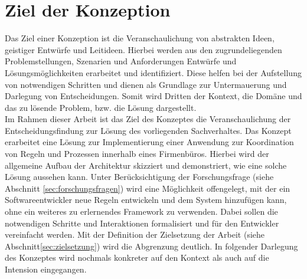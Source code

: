 \section{Ziel der Konzeption}
\label{sec:konzeptziele}
    Das Ziel einer Konzeption ist die Veranschaulichung von abstrakten Ideen, geistiger Entwürfe und Leitideen. 
    Hierbei werden aus den zugrundeliegenden Problemstellungen, Szenarien und Anforderungen Entwürfe und 
    Lösungsmöglichkeiten erarbeitet und identifiziert. Diese helfen bei der Aufstellung von notwendigen Schritten 
    und dienen als Grundlage zur Untermauerung und Darlegung von Entscheidungen. Somit wird Dritten der Kontext, die 
    Domäne und das zu lösende Problem, bzw. die Lösung dargestellt. 
    \\
    \linebreak
    Im Rahmen dieser Arbeit ist das Ziel des Konzeptes die Veranschaulichung der Entscheidungsfindung zur Lösung des vorliegenden 
    Sachverhaltes. Das Konzept 
    erarbeitet eine Lösung zur Implementierung einer Anwendung zur Koordination von Regeln und Prozessen innerhalb eines 
    Firmenbüros. Hierbei wird der allgemeine Aufbau der Architektur skizziert und demonstriert, wie eine solche Lösung aussehen kann. 
    Unter Berücksichtigung der Forschungsfrage (siehe Abschnitt \ref{sec:forschungsfragen}) wird eine Möglichkeit offengelegt, mit der 
    ein Softwareentwickler neue Regeln entwickeln und dem System hinzufügen kann, ohne ein weiteres zu erlernendes Framework zu verwenden. 
    Dabei sollen die notwendigen Schritte und Interaktionen formalisiert und für den Entwickler vereinfacht werden. Mit der 
    Definition der Zielsetzung der Arbeit (siehe Abschnitt\ref{sec:zielsetzung}) wird die Abgrenzung deutlich. In folgender 
    Darlegung des Konzeptes wird nochmals konkreter auf den Kontext als auch auf die Intension eingegangen. 

    
